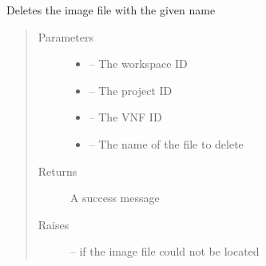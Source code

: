 \documentclass[letterpaper,10pt,english]{sphinxmanual}
\begin{document}
\begin{fulllineitems}
\label{_source/son_editor.impl:son_editor.impl.functionsimpl.delete_image_file}
Deletes the image file with the given name
\begin{quote}\begin{description}
\item[{Parameters}] \leavevmode\begin{itemize}
\item {} 
 -- The workspace ID

\item {} 
 -- The project ID

\item {} 
 -- The VNF ID

\item {} 
 -- The name of the file to delete

\end{itemize}

\item[{Returns}] \leavevmode
A success message

\item[{Raises}] \leavevmode
{\hyperref[_source/son_editor.app:son_editor.app.exceptions.NotFound]{}} -- if the image file could not be located

\end{description}\end{quote}

\end{fulllineitems}

\end{document}
